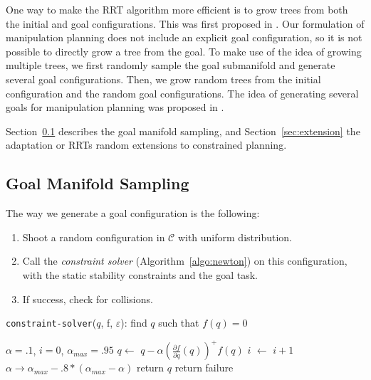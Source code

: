 \documentclass{article}
\begin{document}
One way to make the RRT algorithm more efficient is to grow trees from both the initial
and  goal configurations. This was first proposed in 
\cite{kuffner00rrtconnect}. Our formulation of manipulation planning does
not include an explicit goal configuration, so it is not possible to directly grow
a tree from the goal. To make use of the idea of growing multiple trees, we first
randomly sample the goal submanifold and generate several goal configurations. Then, 
we grow random
trees from the initial configuration and the random goal configurations. The idea of
generating several goals for manipulation planning was proposed in \cite{diankov2008bpc}.

Section~\ref{sec:goal-sampling}  describes the goal manifold sampling, and 
Section~\ref{sec:extension} the adaptation or RRTs random extensions to constrained planning.

\subsection{Goal Manifold Sampling}
\label{sec:goal-sampling}

The way we generate a goal configuration is the following:
\begin{enumerate}
\item Shoot a random configuration in $\mathcal{C}$ with uniform distribution.
\item Call the \textit{constraint solver} (Algorithm~\ref{algo:newton}) on this configuration, with the static
  stability constraints and the goal task.
\item If success, check for collisions.
\end{enumerate}

\begin{algorithm}
\caption{\texttt{constraint-solver}($q$, f, $\varepsilon$): find $q$ such that $f(q) = 0$}
\label{algo:newton}
\begin{algorithmic}
\STATE $\alpha=.1$, $i=0$, $\alpha_{max} = .95$
\STATE $q \leftarrow$ $q - \alpha \left(\frac{\partial f}{\partial q}(q)\right)^{+} f(q)$
\STATE $i$ $\leftarrow$ $i+1$
\STATE $\alpha \rightarrow \alpha_{max} - .8*(\alpha_{max} - \alpha)$
\ENDWHILE
{}
\STATE return $q$
\ELSE
\STATE return failure
\ENDIF
\end{algorithmic}
\end{algorithm}
\end{document}
